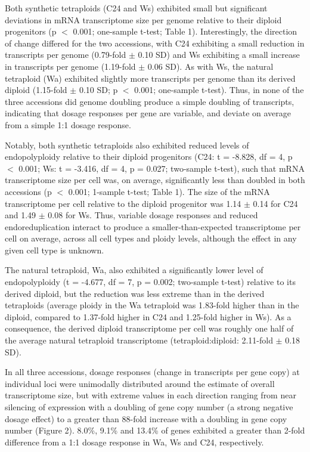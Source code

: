 \documentclass[11pt]{article}
\begin{document}
Both synthetic tetraploids (C24 and Ws) exhibited small but significant deviations in mRNA transcriptome size per genome relative to their diploid progenitors (p $<$ 0.001; one-sample t-test; Table 1). Interestingly, the direction of change differed for the two accessions, with C24 exhibiting a small reduction in transcripts per genome (0.79-fold $\pm$ 0.10 SD) and Ws exhibiting a small increase in transcripts per genome (1.19-fold $\pm$ 0.06 SD). As with Ws, the natural tetraploid (Wa) exhibited slightly more transcripts per genome than its derived diploid (1.15-fold $\pm$ 0.10 SD; p $<$ 0.001; one-sample t-test). Thus, in none of the three accessions did genome doubling produce a simple doubling of transcripts, indicating that dosage responses per gene are variable, and deviate on average from a simple 1:1 dosage response.

Notably, both synthetic tetraploids also exhibited reduced levels of endopolyploidy relative to their diploid progenitors (C24: t = -8.828, df = 4, p $<$ 0.001; Ws: t = -3.416, df = 4, p = 0.027; two-sample t-test), such that mRNA transcriptome size per cell was, on average, significantly less than doubled in both accessions (p $<$ 0.001; 1-sample t-test; Table 1). The size of the mRNA transcriptome per cell relative to the diploid progenitor was 1.14 $\pm$ 0.14 for C24 and 1.49 $\pm$ 0.08 for Ws. Thus, variable dosage responses and reduced endoreduplication interact to produce a smaller-than-expected transcriptome per cell on average, across all cell types and ploidy levels, although the effect in any given cell type is unknown.

The natural tetraploid, Wa, also exhibited a significantly lower level of endopolyploidy (t = -4.677, df = 7, p = 0.002; two-sample t-test) relative to its derived diploid, but the reduction was less extreme than in the derived tetraploids (average ploidy in the Wa tetraploid was 1.83-fold higher than in the diploid, compared to 1.37-fold higher in C24 and 1.25-fold higher in Ws). As a consequence, the derived diploid transcriptome per cell was roughly one half of the average natural tetraploid transcriptome (tetraploid:diploid: 2.11-fold $\pm$ 0.18 SD). 

In all three accessions, dosage responses (change in transcripts per gene copy) at individual loci were unimodally distributed around the estimate of overall transcriptome size, but with extreme values in each direction ranging from near silencing of expression with a doubling of gene copy number (a strong negative dosage effect) to a greater than 88-fold increase with a doubling in gene copy number (Figure 2). 8.0\%, 9.1\% and 13.4\% of genes exhibited a greater than 2-fold difference from a 1:1 dosage response in Wa, Ws and C24, respectively. 
\end{document}
